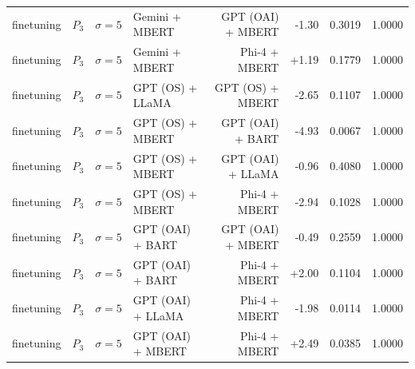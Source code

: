 \begin{table}[htbp]
\begin{tabular*}{\textwidth}{@{\extracolsep{\fill}}llllrrrl}
finetuning & $P_3$ & $\sigma{=}5$ & Gemini + MBERT & GPT (OAI) + MBERT & -1.30 & 0.3019 & 1.0000 \\
finetuning & $P_3$ & $\sigma{=}5$ & Gemini + MBERT & Phi-4 + MBERT & +1.19 & 0.1779 & 1.0000 \\
finetuning & $P_3$ & $\sigma{=}5$ & GPT (OS) + LLaMA & GPT (OS) + MBERT & -2.65 & 0.1107 & 1.0000 \\
finetuning & $P_3$ & $\sigma{=}5$ & GPT (OS) + MBERT & GPT (OAI) + BART & -4.93 & 0.0067 & 1.0000 \\
finetuning & $P_3$ & $\sigma{=}5$ & GPT (OS) + MBERT & GPT (OAI) + LLaMA & -0.96 & 0.4080 & 1.0000 \\
finetuning & $P_3$ & $\sigma{=}5$ & GPT (OS) + MBERT & Phi-4 + MBERT & -2.94 & 0.1028 & 1.0000 \\
finetuning & $P_3$ & $\sigma{=}5$ & GPT (OAI) + BART & GPT (OAI) + MBERT & -0.49 & 0.2559 & 1.0000 \\
finetuning & $P_3$ & $\sigma{=}5$ & GPT (OAI) + BART & Phi-4 + MBERT & +2.00 & 0.1104 & 1.0000 \\
finetuning & $P_3$ & $\sigma{=}5$ & GPT (OAI) + LLaMA & Phi-4 + MBERT & -1.98 & 0.0114 & 1.0000 \\
finetuning & $P_3$ & $\sigma{=}5$ & GPT (OAI) + MBERT & Phi-4 + MBERT & +2.49 & 0.0385 & 1.0000 \\
\hline
\end{tabular*}
\end{table}
\newpage
